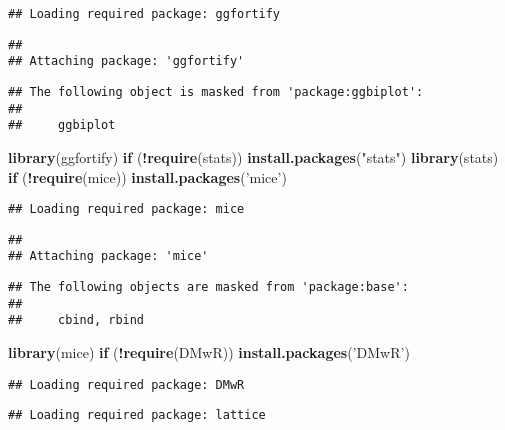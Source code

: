 \documentclass[]{article}
\newenvironment{Shaded}{\begin{snugshade}}{\end{snugshade}}
\newcommand{\ControlFlowTok}[1]{\textcolor[rgb]{0.13,0.29,0.53}{\textbf{#1}}}
\newcommand{\KeywordTok}[1]{\textcolor[rgb]{0.13,0.29,0.53}{\textbf{#1}}}
\newcommand{\NormalTok}[1]{#1}
\newcommand{\OperatorTok}[1]{\textcolor[rgb]{0.81,0.36,0.00}{\textbf{#1}}}
\newcommand{\StringTok}[1]{\textcolor[rgb]{0.31,0.60,0.02}{#1}}
\begin{document}
\begin{verbatim}
## Loading required package: ggfortify
\end{verbatim}

\begin{verbatim}
## 
## Attaching package: 'ggfortify'
\end{verbatim}

\begin{verbatim}
## The following object is masked from 'package:ggbiplot':
## 
##     ggbiplot
\end{verbatim}

\begin{Shaded}
\begin{Highlighting}[]
\KeywordTok{library}\NormalTok{(ggfortify)}
\ControlFlowTok{if}\NormalTok{ (}\OperatorTok{!}\KeywordTok{require}\NormalTok{(stats)) }\KeywordTok{install.packages}\NormalTok{(}\StringTok{"stats"}\NormalTok{)}
\KeywordTok{library}\NormalTok{(stats)}
\ControlFlowTok{if}\NormalTok{ (}\OperatorTok{!}\KeywordTok{require}\NormalTok{(mice)) }\KeywordTok{install.packages}\NormalTok{(}\StringTok{'mice'}\NormalTok{)}
\end{Highlighting}
\end{Shaded}

\begin{verbatim}
## Loading required package: mice
\end{verbatim}

\begin{verbatim}
## 
## Attaching package: 'mice'
\end{verbatim}

\begin{verbatim}
## The following objects are masked from 'package:base':
## 
##     cbind, rbind
\end{verbatim}

\begin{Shaded}
\begin{Highlighting}[]
\KeywordTok{library}\NormalTok{(mice)}
\ControlFlowTok{if}\NormalTok{ (}\OperatorTok{!}\KeywordTok{require}\NormalTok{(DMwR)) }\KeywordTok{install.packages}\NormalTok{(}\StringTok{'DMwR'}\NormalTok{)}
\end{Highlighting}
\end{Shaded}

\begin{verbatim}
## Loading required package: DMwR
\end{verbatim}

\begin{verbatim}
## Loading required package: lattice
\end{verbatim}
\end{document}
